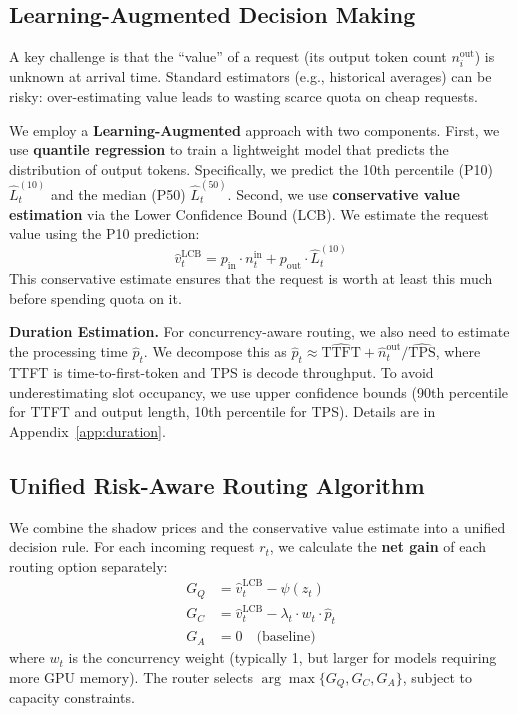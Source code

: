 \subsection{Learning-Augmented Decision Making}

A key challenge is that the ``value'' of a request (its output token count $n_i^{\text{out}}$) is unknown at arrival time. Standard estimators (e.g., historical averages) can be risky: over-estimating value leads to wasting scarce quota on cheap requests.

We employ a \textbf{Learning-Augmented} approach with two components. First, we use \textbf{quantile regression} to train a lightweight model that predicts the distribution of output tokens. Specifically, we predict the 10th percentile (P10) $\hat{L}^{(10)}_t$ and the median (P50) $\hat{L}^{(50)}_t$. Second, we use \textbf{conservative value estimation} via the Lower Confidence Bound (LCB). We estimate the request value using the P10 prediction:
\begin{equation}
    \hat{v}_t^{\text{LCB}} = p_{\text{in}} \cdot n_t^{\text{in}} + p_{\text{out}} \cdot \hat{L}^{(10)}_t
\end{equation}
This conservative estimate ensures that the request is worth at least this much before spending quota on it.

\textbf{Duration Estimation.}
For concurrency-aware routing, we also need to estimate the processing time $\hat{p}_t$. We decompose this as $\hat{p}_t \approx \widehat{\text{TTFT}} + \hat{n}_t^{\text{out}} / \widehat{\text{TPS}}$, where TTFT is time-to-first-token and TPS is decode throughput. To avoid underestimating slot occupancy, we use upper confidence bounds (90th percentile for TTFT and output length, 10th percentile for TPS). Details are in Appendix~\ref{app:duration}.

\subsection{Unified Risk-Aware Routing Algorithm}

We combine the shadow prices and the conservative value estimate into a unified decision rule. For each incoming request $r_t$, we calculate the \textbf{net gain} of each routing option separately:
\begin{align}
    G_Q &= \hat{v}_t^{\text{LCB}} - \psi(z_t) \label{eq:gain_q} \\
    G_C &= \hat{v}_t^{\text{LCB}} - \lambda_t \cdot w_t \cdot \hat{p}_t \label{eq:gain_c} \\
    G_A &= 0 \quad \text{(baseline)} \label{eq:gain_a}
\end{align}
where $w_t$ is the concurrency weight (typically 1, but larger for models requiring more GPU memory). The router selects $\arg\max\{G_Q, G_C, G_A\}$, subject to capacity constraints.

